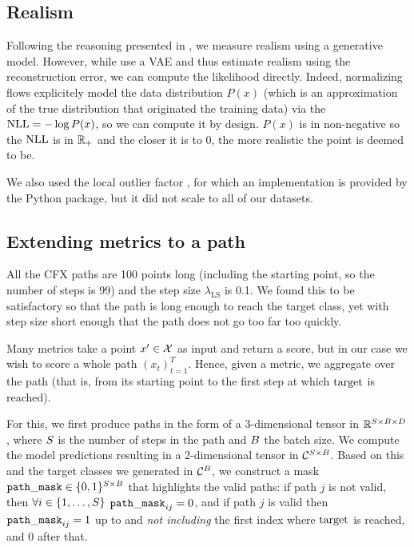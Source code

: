 \documentclass[../main.tex]{subfiles}
\begin{document}
\subsection{Realism}

Following the reasoning presented in \cite{vanlooverenInterpretable2021}, we measure realism using a generative model.
However, while \citeauthor{vanlooverenInterpretable2021} use a VAE and thus estimate realism using the reconstruction error, we can compute the likelihood directly.
Indeed, normalizing flows explicitely model the data distribution $P(x)$ (which is an approximation of the true distribution that originated the training data)
via the $\text{NLL} = - \log P(x)$, so we can compute it by design.
$P(x)$ is in non-negative so the $\text{NLL}$ is in $\mathbb{R}_+$ and the closer it is to 0, the more realistic the point is deemed to be.

We also used the local outlier factor \cite{breunigLOF2000}, for which an implementation is provided by the \sklearn{} Python package, but it did not scale to all of our datasets.

\subsection{Extending metrics to a path}
\label{exp/masking}

All the CFX paths are 100 points long (including the starting point, so the number of steps is 99) and the step size $\lambda_\text{LS}$ is 0.1. We found this to be satisfactory so that the path is long enough to reach the target class, yet with step size short enough that the path does not go too far too quickly.

Many metrics take a point $x' \in \mathcal{X}$ as input and return a score, but in our case we wish to score a whole path $(x_t)_{t=1}^T$.
Hence, given a metric, we aggregate over the path (that is, from its starting point to the first step at which $\mathrm{target}$ is reached).

For this, we first produce paths in the form of a 3-dimensional tensor in $\mathbb{R}^{S \times B \times D}$,
where $S$ is the number of steps in the path and $B$ the batch size.
We compute the model predictions resulting in a 2-dimensional tensor in $\mathcal{C}^{S \times B}$.
Based on this and the target classes we generated in $\mathcal{C}^B$, we construct a mask $\mathtt{path\_mask} \in \{0, 1\}^{S \times B}$ that highlights the valid paths:
if path $j$ is not valid, then
$\forall i \in \{1, \ldots, S\}$ ${\mathtt{path\_mask}_{ij} = 0}$, and if path $j$ is valid then $\mathtt{path\_mask}_{ij} = 1$ up to and \emph{not including} the first index where $\mathrm{target}$ is reached, and 0 after that.
\end{document}
